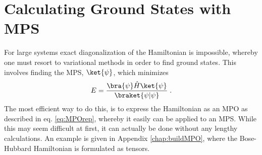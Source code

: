 \chapter{Calculating Ground States with MPS}
For large systems exact diagonalization of the Hamiltonian is impossible, whereby one must resort to variational methods in order to find ground states. This involves finding the MPS, $\ket{\psi}$, which minimizes
\begin{equation}
	E = \frac{\bra{\psi} \hat{H} \ket{\psi}}{\braket{\psi | \psi}} \; .
\end{equation}
The most efficient way to do this, is to express the Hamiltonian as an MPO as described in eq. \eqref{eq:MPOrep}, whereby it easily can be applied to an MPS. While this may seem difficult at first, it can actually be done without any lengthy calculations. An example is given in Appendix \ref{chap:buildMPO}, where the Bose-Hubbard Hamiltonian is formulated as tensors.

